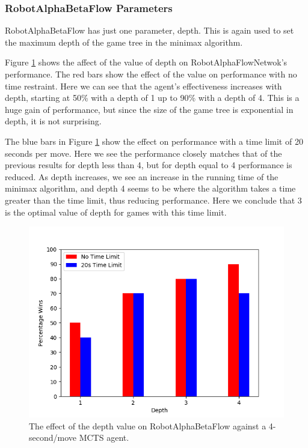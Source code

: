 \subsubsection{RobotAlphaBetaFlow Parameters}

RobotAlphaBetaFlow has just one parameter, depth. This is again used to set the maximum depth of the game tree in the minimax algorithm.

Figure \ref{fig:flowdepth_perf} shows the affect of the value of depth on RobotAlphaFlowNetwok's performance. The red bars show the effect of the value on performance with no time restraint. Here we can see that the agent's effectiveness increases with depth, starting at 50\% with a depth of 1 up to 90\% with a depth of 4. This is a huge gain of performance, but since the size of the game tree is exponential in depth, it is not surprising.

The blue bars in Figure \ref{fig:flowdepth_perf} show the effect on performance with a time limit of 20 seconds per move. Here we see the performance closely matches that of the previous results for depth less than 4, but for depth equal to 4 performance is reduced. As depth increases, we see an increase in the running time of the minimax algorithm, and depth 4 seems to be where the algorithm takes a time greater than the time limit, thus reducing performance. Here we conclude that 3 is the optimal value of depth for games with this time limit.

\begin{figure}
    \centering
    \includegraphics[scale = 0.6]{images/FLOWDEPTH_PERF.png}
    \caption{The effect of the depth value on RobotAlphaBetaFlow against a 4-second/move MCTS agent.}
    \label{fig:flowdepth_perf}
\end{figure}



